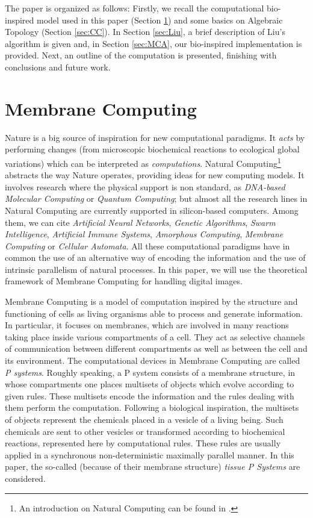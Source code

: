 \documentclass[journal]{IEEEtran}
\begin{document}
The paper is organized as follows: Firstly, we recall the
computational bio-inspired model used in this paper (Section
\ref{sec:MC}) and some basics on Algebraic Topology (Section
\ref{sec:CC}). In Section \ref{sec:Liu}, a brief description of
Liu's algorithm is given and, in Section \ref{sec:MCA}, our
bio-inspired implementation is provided. Next, an outline of the
computation is presented, finishing with conclusions and future
work.

\section{Membrane Computing}\label{sec:MC}
Nature is a big source of inspiration for new computational
paradigms. It {\it acts} by performing changes (from microscopic
biochemical reactions to ecological global variations) which can be
interpreted as {\it computations}. Natural Computing\footnote{An
introduction on Natural Computing can be found in
\cite{DBLP:journals/cacm/KariR08}.} abstracts the way Nature
operates, providing ideas for new computing models. It involves
research where the physical support is non standard, as {\it
DNA-based Molecular Computing} or {\it Quantum Computing}; but
almost all the research lines in Natural Computing are currently
supported in silicon-based computers. Among them, we can cite {\it
Artificial Neural Networks}, {\it Genetic Algorithms}, {\it Swarm
Intelligence}, {\it Artificial Immune Systems}, {\it Amorphous
Computing}, {\it Membrane Computing} or {\it Cellular Automata}. All
these computational paradigms have in common the use of an
alternative way of encoding the information and the use of intrinsic
parallelism of natural processes. In this paper, we will use the
theoretical framework of Membrane Computing for handling digital
images.

Membrane Computing \cite{HandbookMC10} is a model of computation
inspired by the structure and functioning of cells as living
organisms able to process and generate information. In particular,
it focuses on membranes, which are involved in many reactions taking
place inside various compartments of a cell. They act as selective
channels of communication between different compartments as well as
between the cell and its environment. The computational devices in
Membrane Computing are called \emph{P systems}. Roughly speaking, a
P system consists of a membrane structure, in whose compartments one
places multisets of objects which evolve according to given rules.
These multisets encode the information and the rules dealing with
them perform the computation. Following a biological inspiration,
the multisets of objects represent the chemicals placed in a vesicle
of a living being. Such chemicals are sent to other vesicles or
transformed according to biochemical reactions, represented here by
computational rules. These rules are usually applied in a
synchronous non-deterministic maximally parallel manner. In this
paper, the so-called (because of their membrane structure) {\it
tissue P Systems} \cite{DBLP:journals/tcs/Martin-VidePPR03} are
considered.
\end{document}
